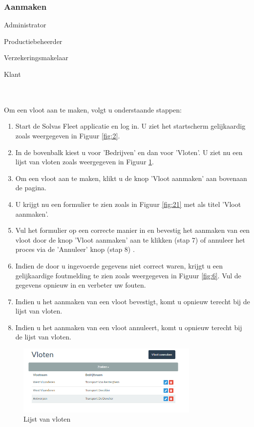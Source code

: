 \documentclass[11pt,openany]{article}
\newcommand{\cmark}{\ding{51}}%
\newcommand{\xmark}{\ding{55}}%
\newcommand{\done}{\rlap{$\square$}{\raisebox{2pt}{\large\hspace{1pt}\cmark}}%
	\hspace{-2.5pt}}
\newcommand{\wontfix}{\rlap{$\square$}{\large\hspace{1pt}\xmark}}
\begin{document}
\subsubsection{Aanmaken}

\begin{todolist}
	\item[\done] Administrator
	\item[\done] Productiebeheerder
	\item[\done] Verzekeringsmakelaar
	\item[\wontfix] Klant 
\end{todolist}
\\
\\
Om een vloot aan te maken, volgt u onderstaande stappen:
\begin{enumerate}
	\item Start de Solvas Fleet applicatie en log in. U ziet het startscherm gelijkaardig zoals weergegeven in Figuur \ref{fig:2}.
	\item In de bovenbalk kiest u voor 'Bedrijven' en dan voor 'Vloten'. U ziet nu een lijst van vloten zoals weergegeven in Figuur \ref{fig:20}.
	\item Om een vloot aan te maken, klikt u de knop 'Vloot aanmaken' aan bovenaan de pagina.
	\item U krijgt nu een formulier te zien zoals in Figuur \ref{fig:21} met als titel 'Vloot aanmaken'.
	\item Vul het formulier op een correcte manier in en bevestig het aanmaken van een vloot door de knop 'Vloot aanmaken' aan te klikken (stap 7) of annuleer het proces via de 'Annuleer' knop (stap 8) .
	\item Indien de door u ingevoerde gegevens niet correct waren, krijgt u een gelijkaardige foutmelding te zien zoals weergegeven in Figuur \ref{fig:6}. Vul de gegevens opnieuw in en verbeter uw fouten.
	\item Indien u het aanmaken van een vloot bevestigt, komt u opnieuw terecht bij de lijst van vloten. 
	
	\item Indien u het aanmaken van een vloot annuleert, komt u opnieuw terecht bij de lijst van vloten.
	
\end{enumerate}
\begin{figure}
	\centering
	\includegraphics[width=0.8\textwidth]{img/fig20.png}
	\caption{Lijst van vloten} 
	\label{fig:20} 
\end{figure}
\end{document}
